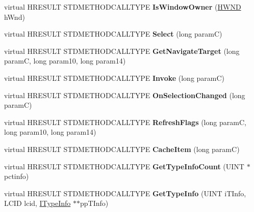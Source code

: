 \begin{DoxyCompactItemize}
virtual H\+R\+E\+S\+U\+LT S\+T\+D\+M\+E\+T\+H\+O\+D\+C\+A\+L\+L\+T\+Y\+PE {\bfseries Is\+Window\+Owner} (\hyperlink{interfacevoid}{H\+W\+ND} h\+Wnd)
\item 
\mbox{\label{class_c_explorer_band_a80f23230bac8a31b964c1b44a7b3eb62}} 
virtual H\+R\+E\+S\+U\+LT S\+T\+D\+M\+E\+T\+H\+O\+D\+C\+A\+L\+L\+T\+Y\+PE {\bfseries Select} (long paramC)
\item 
\mbox{\label{class_c_explorer_band_a68ba52acf1ea8ccecc98f912495ae3b3}} 
virtual H\+R\+E\+S\+U\+LT S\+T\+D\+M\+E\+T\+H\+O\+D\+C\+A\+L\+L\+T\+Y\+PE {\bfseries Get\+Navigate\+Target} (long paramC, long param10, long param14)
\item 
\mbox{\label{class_c_explorer_band_af08fb77fce0d805d29d28edb252682b6}} 
virtual H\+R\+E\+S\+U\+LT S\+T\+D\+M\+E\+T\+H\+O\+D\+C\+A\+L\+L\+T\+Y\+PE {\bfseries Invoke} (long paramC)
\item 
\mbox{\label{class_c_explorer_band_a26d5d8df1704d96e34d01c636718d261}} 
virtual H\+R\+E\+S\+U\+LT S\+T\+D\+M\+E\+T\+H\+O\+D\+C\+A\+L\+L\+T\+Y\+PE {\bfseries On\+Selection\+Changed} (long paramC)
\item 
\mbox{\label{class_c_explorer_band_a501662f2ba295581965fdf7b953c2304}} 
virtual H\+R\+E\+S\+U\+LT S\+T\+D\+M\+E\+T\+H\+O\+D\+C\+A\+L\+L\+T\+Y\+PE {\bfseries Refresh\+Flags} (long paramC, long param10, long param14)
\item 
\mbox{\label{class_c_explorer_band_aa0a5e076f26fa603caa4bcd82c4f12bf}} 
virtual H\+R\+E\+S\+U\+LT S\+T\+D\+M\+E\+T\+H\+O\+D\+C\+A\+L\+L\+T\+Y\+PE {\bfseries Cache\+Item} (long paramC)
\item 
\mbox{\label{class_c_explorer_band_a234439176f3b92b21286bb124705151b}} 
virtual H\+R\+E\+S\+U\+LT S\+T\+D\+M\+E\+T\+H\+O\+D\+C\+A\+L\+L\+T\+Y\+PE {\bfseries Get\+Type\+Info\+Count} (U\+I\+NT $\ast$pctinfo)
\item 
\mbox{\label{class_c_explorer_band_a5c02751cbac3e8b2d9578198cc2df5bc}} 
virtual H\+R\+E\+S\+U\+LT S\+T\+D\+M\+E\+T\+H\+O\+D\+C\+A\+L\+L\+T\+Y\+PE {\bfseries Get\+Type\+Info} (U\+I\+NT i\+T\+Info, L\+C\+ID lcid, \hyperlink{interface_i_type_info}{I\+Type\+Info} $\ast$$\ast$pp\+T\+Info)
$$
\end{DoxyCompactItemize}

